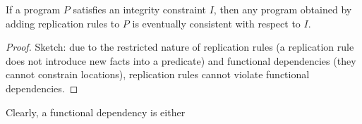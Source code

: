 \begin{lemma}
If a program $P$ satisfies an integrity constraint $I$, then any program obtained by adding replication rules to $P$ is eventually consistent with respect to $I$.
\end{lemma}
\begin{proof}
Sketch: due to the restricted nature of replication rules (a replication rule does not introduce new facts into a predicate) and functional dependencies (they cannot constrain locations), replication rules cannot violate functional dependencies.
\end{proof}

Clearly, a functional dependency is either

\begin{lemma}

\end{lemma}
